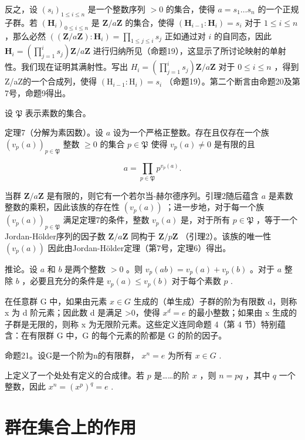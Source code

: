 反之，设 \((s_i)_{1 \leqslant i \leqslant n}\) 是一个整数序列 \(>0\) 的集合，使得 \(a = s_1 \ldots s_n\) 的一个正规子群。若 \((\mathbf{H}_i)_{0 \leqslant i \leqslant n}\) 是 \(\mathbf{Z} / a\mathbf{Z}\) 的集合，使得 \((\mathbf{H}_{i-1} : \mathbf{H}_i) = s_i\) 对于 \(1 \leqslant i \leqslant n\) ，那么必然 \(((\mathbf{Z} / a\mathbf{Z}) : \mathbf{H}_i) = \prod_{1 \leqslant j \leqslant i} s_j\) 正如通过对 \(i\) 的自同态，因此 \(\mathbf{H}_i = \left( \prod_{j=1}^{i} s_j \right) \mathbf{Z} / a\mathbf{Z}\) 进行归纳所见（命题19），这显示了所讨论映射的单射性。我们现在证明其满射性。写出 \(H_{i}=\left(\prod_{j=1}^{i}s_{j}\right)\mathbf{Z}/a\mathbf{Z}\) 对于 \(0\leqslant i\leqslant n\) ，得到Z/aZ的一个合成列，使得 \((\mathrm{H}_{i-1}:\mathrm{H}_{i})=s_{i}\) （命题19）。第二个断言由命题20及第7号，命题9得出。

设 \(\mathfrak{P}\) 表示素数的集合。

定理7（分解为素因数）。设 \(a\) 设为一个严格正整数。存在且仅存在一个族 \((v_{p}(a))_{p \in \mathfrak{P}}\) 整数 \(\geqslant 0\) 的集合 \(p \in \mathfrak{P}\) 使得 \(v_{p}(a) \neq 0\) 是有限的且

\[
a = \prod_ {p \in \mathfrak {P}} p ^ {v _ {p} (a)}.\tag{5}
\]

当群 \(\mathbf{Z}/a\mathbf{Z}\) 是有限的，则它有一个若尔当-赫尔德序列。引理2随后蕴含 \(a\) 是素数整数的乘积，因此该族的存在性 \((v_{p}(a))\) ；进一步地，对于每一个族 \((v_{p}(a))_{p\in\mathfrak{P}}\) 满足定理7的条件，整数 \(v_{p}(a)\) 是，对于所有 \(p\in\mathfrak{P}\) ，等于一个Jordan-Hölder序列的因子数 \(\mathbf{Z}/a\mathbf{Z}\) 同构于 \(\mathbf{Z}/p\mathbf{Z}\) （引理2）。该族的唯一性 \((v_{p}(a))\) 因此由Jordan-Hölder定理（第7号，定理6）得出。

推论。设 \(a\) 和 \(b\) 是两个整数 \(>0\) 。则 \(v_{p}(ab) = v_{p}(a) + v_{p}(b)\) 。对于 \(a\) 整除 \(b\) ，必要且充分的条件是 \(v_{p}(a) \leqslant v_{p}(b)\) 对于每个素数 \(p\) .

在任意群 G 中，如果由元素 \(x \in G\) 生成的（单生成）子群的阶为有限数 d，则称 x 为 d 阶元素；因此数 d 是满足 \textgreater0，使得 \(x^{d} = e\) 的最小整数；如果由 x 生成的子群是无限的，则称 x 为无限阶元素。这些定义连同命题 4（第 4 节）特别蕴含：在有限群 G 中，G 的每个元素的阶都是 G 的阶的因子。

命题21。设G是一个阶为n的有限群， \(x^{n} = e\) 为所有 \(x \in G\) .

上定义了一个处处有定义的合成律。若 \(p\) 是……的阶 \(x\) ，则 \(n = pq\) ，其中 \(q\) 一个整数，因此 \(x^n = (x^p)^q = e\) .

\section{群在集合上的作用}

